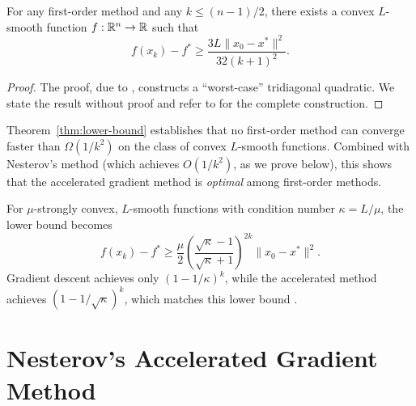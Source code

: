 \documentclass[11pt,a4paper]{article}
\begin{document}
\begin{theorem}%
\label{thm:lower-bound}
For any first-order method and any $k \le (n-1)/2$, there exists a
convex $L$-smooth function $f : \mathbb{R}^n \to \mathbb{R}$ such that
\begin{equation}\label{eq:lower-bound}
  f(x_k) - f^* \ge \frac{3L \|x_0 - x^*\|^2}{32(k+1)^2}.
\end{equation}
\end{theorem}

\begin{proof}
The proof, due to \citet{nesterov2004}, constructs a ``worst-case''
tridiagonal quadratic. We state the result without proof and refer to
\citet[Theorem~2.1.7]{nesterov2004} for the complete construction.
\end{proof}

\begin{remark}[Interpretation]\label{rem:lower-interpretation}
Theorem~\ref{thm:lower-bound} establishes that no first-order method
can converge faster than $\Omega(1/k^2)$ on the class of convex
$L$-smooth functions. Combined with Nesterov's method (which achieves
$O(1/k^2)$, as we prove below), this shows that the accelerated gradient
method is \emph{optimal} among first-order methods.
\end{remark}

\begin{remark}\label{rem:sc-lower}
For $\mu$-strongly convex, $L$-smooth functions with condition number
$\kappa = L/\mu$, the lower bound becomes
\begin{equation}\label{eq:sc-lower-bound}
  f(x_k) - f^* \ge \frac{\mu}{2}
  \left(\frac{\sqrt{\kappa} - 1}{\sqrt{\kappa} + 1}\right)^{2k}
  \|x_0 - x^*\|^2.
\end{equation}
Gradient descent achieves only $(1 - 1/\kappa)^k$, while the accelerated
method achieves $(1 - 1/\sqrt{\kappa})^k$, which matches this lower bound
\citep{nesterov2004}.
\end{remark}


\section{Nesterov's Accelerated Gradient Method}\label{sec:algorithm}
\end{document}
